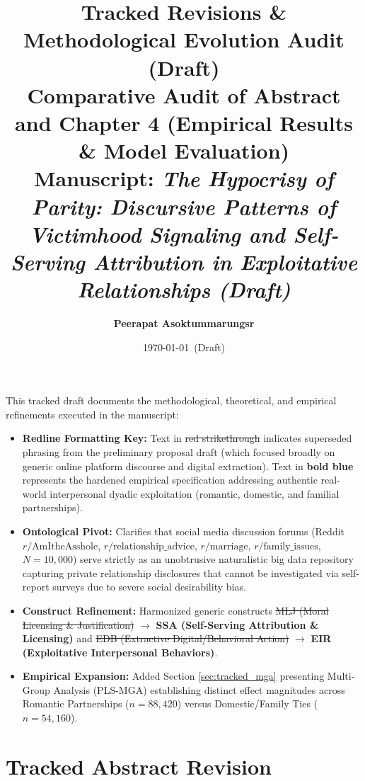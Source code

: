 \documentclass[11pt,a4paper]{article}
\title{\textbf{\Large Tracked Revisions \& Methodological Evolution Audit (Draft)}\\[1ex]
\large Comparative Audit of Abstract and Chapter 4 (Empirical Results \& Model Evaluation)\\[1.5ex]
\normalsize \textbf{Manuscript:} \textit{The Hypocrisy of Parity: Discursive Patterns of Victimhood Signaling and Self-Serving Attribution in Exploitative Relationships (Draft)}}
\author{\textbf{Peerapat Asoktummarungsr}}
\date{\today\ (Draft)}
\newcommand{\textadded}[1]{{\color{blue!80!black}\textbf{#1}}}
\newcommand{\textdeleted}[1]{{\color{red!70!black}\sout{#1}}}
\begin{document}
\maketitle
\thispagestyle{fancy}

\begin{tcolorbox}[colback=blue!5!white,colframe=blue!60!black,title=\textbf{Audit Protocol: Redline Conventions \& Ontological Pivot Justification}]
\small
This tracked draft documents the methodological, theoretical, and empirical refinements executed in the manuscript:
\begin{itemize}[leftmargin=*,itemsep=1pt]
    \item \textbf{Redline Formatting Key:} Text in \textdeleted{red strikethrough} indicates superseded phrasing from the preliminary proposal draft (which focused broadly on generic online platform discourse and digital extraction). Text in \textadded{bold blue} represents the hardened empirical specification addressing authentic real-world interpersonal dyadic exploitation (romantic, domestic, and familial partnerships).
    \item \textbf{Ontological Pivot:} Clarifies that social media discussion forums (Reddit $r/\text{AmItheAsshole}$, $r/\text{relationship\_advice}$, $r/\text{marriage}$, $r/\text{family\_issues}$, $N = 10,000$) serve strictly as an unobtrusive naturalistic big data repository capturing private relationship disclosures that cannot be investigated via self-report surveys due to severe social desirability bias.
    \item \textbf{Construct Refinement:} Harmonized generic constructs \textdeleted{MLJ (Moral Licensing \& Justification)} $\rightarrow$ \textadded{SSA (Self-Serving Attribution \& Licensing)} and \textdeleted{EDB (Extractive Digital/Behavioral Action)} $\rightarrow$ \textadded{EIR (Exploitative Interpersonal Behaviors)}.
    \item \textbf{Empirical Expansion:} Added Section \ref{sec:tracked_mga} presenting Multi-Group Analysis (PLS-MGA) establishing distinct effect magnitudes across Romantic Partnerships ($n = 88,420$) versus Domestic/Family Ties ($n = 54,160$).
\end{itemize}
\end{tcolorbox}

\vspace{1em}

\section{Tracked Abstract Revision}
\label{sec:tracked_abstract}
\end{document}
